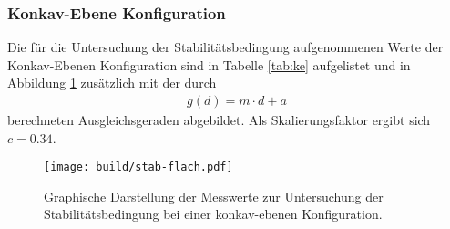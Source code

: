 
\FloatBarrier

\subsubsection{Konkav-Ebene Konfiguration}
Die für die Untersuchung der Stabilitätsbedingung aufgenommenen Werte der
Konkav-Ebenen Konfiguration sind in Tabelle \ref{tab:ke} aufgelistet und
in Abbildung \ref{plt:ke} zusätzlich mit der durch
\begin{align*}
  g(d) = m\cdot d + a
\end{align*}
berechneten Ausgleichsgeraden abgebildet. Als Skalierungsfaktor ergibt
sich $c = \num{0.34}$.

\begin{figure}[htb]
  \centering
  \texttt{[image: build/stab-flach.pdf]}
  \caption{Graphische Darstellung der Messwerte zur Untersuchung der Stabilitätsbedingung bei einer konkav-ebenen Konfiguration.}
  \label{plt:ke}
\end{figure}
\FloatBarrier


\FloatBarrier

